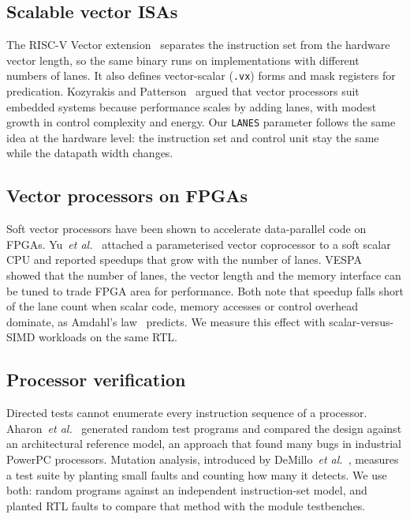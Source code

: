 \documentclass[conference]{IEEEtran}
\begin{document}
\subsection{Scalable vector ISAs}
The RISC-V Vector extension~\cite{riscvv2021} separates the instruction set from
the hardware vector length, so the same binary runs on implementations with
different numbers of lanes. It also defines vector-scalar (\texttt{.vx}) forms
and mask registers for predication. Kozyrakis and Patterson~\cite{kozyrakis2003}
argued that vector processors suit embedded systems because performance scales
by adding lanes, with modest growth in control complexity and energy. Our
\texttt{LANES} parameter follows the same idea at the hardware level: the
instruction set and control unit stay the same while the datapath width
changes.

\subsection{Vector processors on FPGAs}
Soft vector processors have been shown to accelerate data-parallel code on FPGAs.
Yu~\emph{et al.}~\cite{yu2008} attached a parameterised vector coprocessor to a
soft scalar CPU and reported speedups that grow with the number of lanes.
VESPA~\cite{yiannacouras2008} showed that the number of lanes, the vector length
and the memory interface can be tuned to trade FPGA area for performance. Both
note that speedup falls short of the lane count when scalar code, memory
accesses or control overhead dominate, as Amdahl's law~\cite{amdahl1967}
predicts. We measure this effect with scalar-versus-SIMD workloads on the
same RTL.

\subsection{Processor verification}
Directed tests cannot enumerate every instruction sequence of a processor.
Aharon~\emph{et al.}~\cite{aharon1995} generated random test programs and
compared the design against an architectural reference model, an approach
that found many bugs in industrial PowerPC processors. Mutation analysis,
introduced by DeMillo~\emph{et al.}~\cite{demillo1978}, measures a test
suite by planting small faults and counting how many it detects. We use both:
random programs against an independent instruction-set model, and planted RTL
faults to compare that method with the module testbenches.
\end{document}
